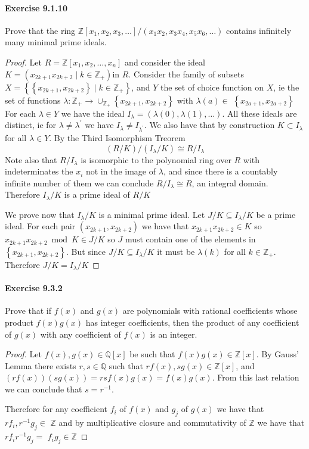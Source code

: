 \documentclass{article}
\theoremstyle{definition}
\begin{document}
\paragraph{Exercise 9.1.10} Prove that the ring $\mathbb{Z}\left[x_{1}, x_{2}, x_{3}, \ldots\right] /\left(x_{1} x_{2}, x_{3} x_{4}, x_{5} x_{6}, \ldots\right)$ contains infinitely many minimal prime ideals.
\begin{proof}
    Let $R=\mathbb{Z}\left[x_1, x_2, \ldots, x_n\right]$ and consider the ideal $K=\left(x_{2 k+1} x_{2 k+2} \mid k \in \mathbb{Z}_{+}\right)$in $R$.
Consider the family of subsets $X=\left\{\left\{x_{2 k+1}, x_{2 k+2}\right\} \mid k \in \mathbb{Z}_{+}\right\}$, and $Y$ the set of choice function on $X$, ie the set of functions $\lambda: \mathbb{Z}_{+} \rightarrow \cup_{\mathbb{Z}_{+}}\left\{x_{2 k+1}, x_{2 k+2}\right\}$ with $\lambda(a) \in$ $\left\{x_{2 a+1}, x_{2 a+2}\right\}$
For each $\lambda \in Y$ we have the ideal $I_\lambda=(\lambda(0), \lambda(1), \ldots)$.
All these ideals are distinct, ie for $\lambda \neq \lambda^{\prime}$ we have $I_\lambda \neq I_{\lambda^{\prime}}$.
We also have that by construction $K \subset I_\lambda$ for all $\lambda \in Y$.
By the Third Isomorphism Treorem
$$
(R / K) /\left(I_\lambda / K\right) \cong R / I_\lambda
$$
Note also that $R / I_\lambda$ is isomorphic to the polynomial ring over $R$ with indeterminates the $x_i$ not in the image of $\lambda$, and since there is a countably infinite number of them we can conclude $R / I_\lambda \cong R$, an integral domain. Therefore $I_\lambda / K$ is a prime ideal of $R / K$

We prove now that $I_\lambda / K$ is a minimal prime ideal. Let $J / K \subseteq I_\lambda / K$ be a prime ideal. For each pair $\left(x_{2 k+1}, x_{2 k+2}\right)$ we have that $x_{2 k+1} x_{2 k+2} \in K$ so $x_{2 k+1} x_{2 k+2} \bmod K \in J / K$ so $J$ must contain one of the elements in $\left\{x_{2 k+1}, x_{2 k+2}\right\}$. But since $J / K \subseteq I_\lambda / K$ it must be $\lambda(k)$ for all $k \in \mathbb{Z}_{+}$. Therefore $J / K=I_\lambda / K$
\end{proof}



\paragraph{Exercise 9.3.2} Prove that if $f(x)$ and $g(x)$ are polynomials with rational coefficients whose product $f(x) g(x)$ has integer coefficients, then the product of any coefficient of $g(x)$ with any coefficient of $f(x)$ is an integer.
\begin{proof}
    Let $f(x), g(x) \in \mathbb{Q}[x]$ be such that $f(x) g(x) \in \mathbb{Z}[x]$.
By Gauss' Lemma there exists $r, s \in \mathbb{Q}$ such that $r f(x), s g(x) \in \mathbb{Z}[x]$, and $(r f(x))(s g(x))=r s f(x) g(x)=f(x) g(x)$. From this last relation we can conclude that $s=r^{-1}$.

Therefore for any coefficient $f_i$ of $f(x)$ and $g_j$ of $g(x)$ we have that $r f_i, r^{-1} g_j \in$ $\mathbb{Z}$ and by multiplicative closure and commutativity of $\mathbb{Z}$ we have that $r f_i r^{-1} g_j=$ $f_i g_j \in \mathbb{Z}$
\end{proof}
\end{document}

